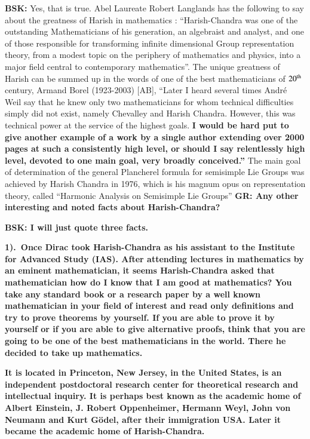 \textbf{BSK:} Yes, that is true.  Abel Laureate Robert Langlands has the following to say about the greatness of Harish in mathematics \cite{chap17-key07RPL} : “Harish-Chandra was one of the outstanding Mathematicians of his generation, an algebraist and analyst, and one of those responsible for transforming infinite dimensional Group representation theory, from a modest topic on the periphery of mathematics and physics, into a major field central to contemporary mathematics”. The unique greatness of Harish can be summed up in the words of one of the best mathematicians of $20^{\rm th}$ century, Armand Borel (1923-2003) [AB], “Later I heard several times André Weil say that he knew only two mathematicians for whom technical difficulties simply did not exist, namely Chevalley and Harish Chandra.  However, this was technical power at the service of the highest goals. \textbf{I would be hard put to give another example of a work by a single author extending over 2000 pages at such a consistently high level, or should I say relentlessly high level, devoted to one main goal, very broadly conceived.”}  The main goal of determination of the general Plancherel formula for semisimple Lie Groups was achieved by Harish Chandra in 1976, which is his magnum opus on representation theory, called “Harmonic Analysis on Semisimple Lie Groups” \textbf{GR: Any other interesting and noted facts about Harish-Chandra?}

\textbf{BSK:  I will just quote three facts.}

\textbf{1).~Once Dirac took Harish-Chandra as his assistant to  the Institute for Advanced Study (IAS). After attending  lectures in mathematics by an eminent mathematician,  it seems Harish-Chandra asked that mathematician how do I know that I am good at mathematics? You take any standard book or a research paper by a well known mathematician in your field of interest and read only definitions and try to prove theorems by yourself. If you are able to prove it by yourself or if you are able to give alternative proofs, think that you are going to be one of the best mathematicians in the world. There he decided to take up mathematics.}

\textbf{It is located in Princeton, New Jersey, in the United States, is an independent postdoctoral research center for theoretical research and intellectual inquiry. It is perhaps best known as the academic home of Albert Einstein, J. Robert Oppenheimer, Hermann Weyl, John von Neumann and Kurt Gödel, after their immigration USA. \small{Later it became the academic home of Harish-Chandra.}}

